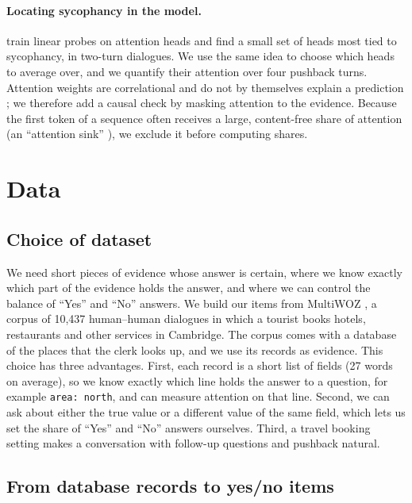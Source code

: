\documentclass[sigconf,nonacm]{acmart}
\begin{document}
\paragraph{Locating sycophancy in the model.} \citet{genadi2026heads} train linear probes on attention
heads and find a small set of heads most tied to sycophancy, in two-turn dialogues. We use the same idea
to choose which heads to average over, and we quantify their attention over four pushback turns.
Attention weights are correlational and do not by themselves explain a prediction
\cite{jain2019attention}; we therefore add a causal check by masking attention to the evidence.
Because the first token of a sequence often receives a large, content-free share of attention (an
``attention sink'' \cite{xiao2024sinks}), we exclude it before computing shares.

\section{Data}
\label{sec:data}

\subsection{Choice of dataset}

We need short pieces of evidence whose answer is certain, where we know exactly which part of the
evidence holds the answer, and where we can control the balance of ``Yes'' and ``No'' answers. We build
our items from MultiWOZ \cite{budzianowski2018multiwoz,zang2020multiwoz22}, a corpus of 10,437
human--human dialogues in which a tourist books hotels, restaurants and other services in Cambridge. The
corpus comes with a database of the places that the clerk looks up, and we use its records as evidence.
This choice has three advantages. First, each record is a short list of fields (27 words on average), so
we know exactly which line holds the answer to a question, for example \texttt{area: north}, and can
measure attention on that line. Second, we can ask about either the true value or a different value of
the same field, which lets us set the share of ``Yes'' and ``No'' answers ourselves. Third, a travel
booking setting makes a conversation with follow-up questions and pushback natural.

\subsection{From database records to yes/no items}
\end{document}
